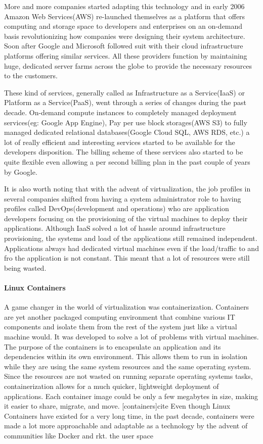 \documentclass[12pt,titlepage]{article}
\begin{document}
More and more companies started adapting this technology and in early 2006
Amazon Web Services(AWS) re-launched themselves as a platform that offers
computing and storage space to developers and enterprises on an on-demand basis
revolutionizing how companies were designing their system architecture. Soon
after Google and Microsoft followed suit with their cloud infrastructure
platforms offering similar services. All these providers function by maintaining
huge, dedicated server farms across the globe to provide the necessary resources
to the customers.

These kind of services, generally called as Infrastructure as a Service(IaaS) or
Platform as a Service(PaaS), went through a
series of changes during the past decade. On-demand compute instances to
completely managed deployment services(eg: Google App Engine), Pay per use block
storages(AWS S3) to fully managed dedicated relational databases(Google Cloud
SQL, AWS RDS, etc.) a lot of really efficient and interesting services started
to be available for the developers disposition. The billing scheme of these
services also started to be quite flexible even allowing a per second billing
plan in the past couple of years by Google.

It is also worth noting that with the advent of virtualization, the job profiles
in several companies shifted from having a system administrator role to 
having profiles called DevOps(development and
operations) who are application developers focusing on the provisioning of the
virtual machines to deploy their applications. Although IaaS solved a lot of
hassle around infrastructure provisioning, the systems and load of the
applications still remained independent. Applications always had dedicated virtual machines
even if the load/traffic to and fro the application is not constant. This meant that a
lot of resources were still being wasted.

\paragraph{Linux Containers}
\label{sec:org08c20fa}
A game changer in the world of virtualization was containerization. Containers
are yet another packaged computing environment that combine various IT
components and isolate them from the rest of the system just like a virtual
machine would. It was developed to solve a lot of problems with virtual
machines. The purpose of the containers is to encapsulate an application and its dependencies within its own environment. This allows them to run in isolation while they are using the same system resources and the same operating system. Since the resources are not wasted on running separate operating systems tasks, containerization allows for a much quicker, lightweight deployment of applications. Each container image could be only a few megabytes in size, making it easier to share, migrate, and move.
[containers]cite Even though Linux Containers
have existed for a very long time, in the past decade, containers were made a
lot more approachable and adaptable as a
technology by the advent of communities like Docker and rkt.  the user space
\end{document}
